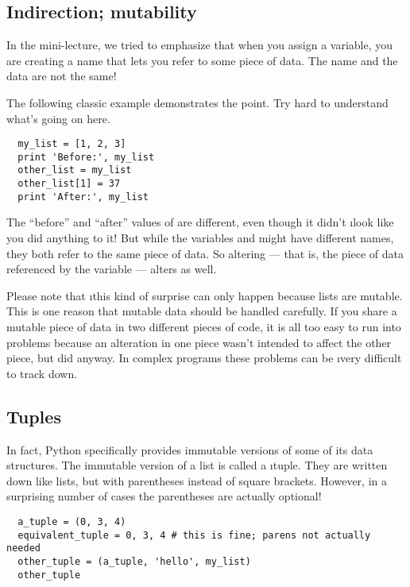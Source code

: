 \documentclass[letterpaper, 12pt, titlepage, twoside]{article}
\begin{document}
\subsection*{Indirection; mutability}

In the mini-lecture, we tried to emphasize that when you assign a variable,
you are creating a name that lets you refer to some piece of data. The name
and the data are not the same!

The following classic example demonstrates the point. Try hard to understand
what's going on here.

\begin{lstlisting}
  my_list = [1, 2, 3]
  print 'Before:', my_list
  other_list = my_list
  other_list[1] = 37
  print 'After:', my_list
\end{lstlisting}

The ``before'' and ``after'' values of  are different, even though
it didn't \i{look} like you did anything to it! But while the variables
 and  might have different names, they both refer
to the same piece of data. So altering  --- that is, the piece
of data referenced by the variable  --- alters  as
well.

Please note that \i{this kind of surprise can only happen because lists are
  mutable.} This is one reason that mutable data should be handled carefully.
If you share a mutable piece of data in two different pieces of code, it is
all too easy to run into problems because an alteration in one piece wasn't
intended to affect the other piece, but did anyway. In complex programs these
problems can be \i{very} difficult to track down.

\subsection*{Tuples}

In fact, Python specifically provides immutable versions of some of its data
structures. The immutable version of a list is called a \i{tuple}. They are
written down like lists, but with parentheses instead of square brackets.
However, in a surprising number of cases the parentheses are actually
optional!

\begin{lstlisting}
  a_tuple = (0, 3, 4)
  equivalent_tuple = 0, 3, 4 # this is fine; parens not actually needed
  other_tuple = (a_tuple, 'hello', my_list)
  other_tuple
\end{lstlisting}
\end{document}
